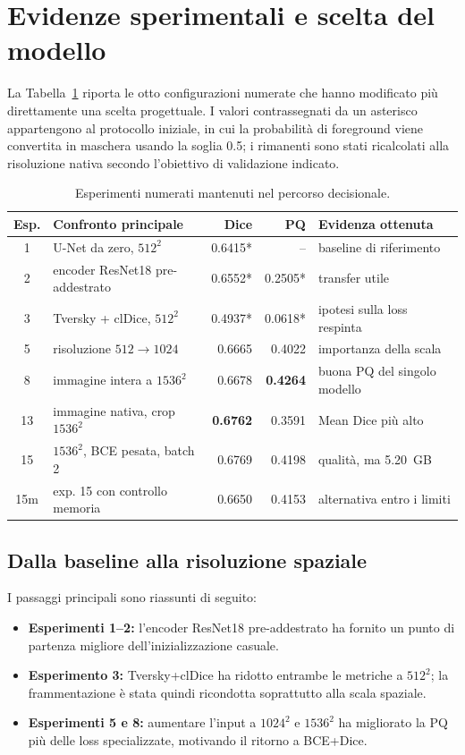 \section{Evidenze sperimentali e scelta del modello}
\label{sec:results}

La Tabella~\ref{tab:experiments} riporta le otto configurazioni numerate che hanno
modificato più direttamente una scelta progettuale. I valori contrassegnati da un
asterisco appartengono al protocollo iniziale, in cui la probabilità di foreground viene
convertita in maschera usando la soglia 0.5; i rimanenti sono stati
ricalcolati alla risoluzione nativa secondo l'obiettivo di validazione indicato.

\begin{table}[H]
  \centering
  \caption{Esperimenti numerati mantenuti nel percorso decisionale.}
  \label{tab:experiments}
  \small\begin{tabular}{clrrl}
    \toprule
    Esp. & Confronto principale & Dice & PQ & Evidenza ottenuta \\
    \midrule
    1 & U-Net da zero, $512^2$ & 0.6415* & -- & baseline di riferimento \\
    2 & encoder ResNet18 pre-addestrato & 0.6552* & 0.2505* & transfer utile \\
    3 & Tversky + clDice, $512^2$ & 0.4937* & 0.0618* & ipotesi sulla loss respinta \\
    5 & risoluzione $512\to1024$ & 0.6665 & 0.4022 & importanza della scala \\
    8 & immagine intera a $1536^2$ & 0.6678 & \textbf{0.4264} & buona PQ del singolo modello \\
    13 & immagine nativa, crop $1536^2$ & \textbf{0.6762} & 0.3591 & Mean Dice più alto \\
    15 & $1536^2$, BCE pesata, batch 2 & 0.6769 & 0.4198 & qualità, ma 5.20~GB \\
    15m & exp. 15 con controllo memoria & 0.6650 & 0.4153 & alternativa entro i limiti \\
    \bottomrule
  \end{tabular}
\end{table}

\subsection{Dalla baseline alla risoluzione spaziale}

I passaggi principali sono riassunti di seguito:

\begin{itemize}
\setlength{\itemsep}{0.15em}
\item \textbf{Esperimenti 1--2:} l'encoder ResNet18 pre-addestrato ha fornito un punto di partenza migliore dell'inizializzazione casuale.
\item \textbf{Esperimento 3:} Tversky+clDice ha ridotto entrambe le metriche a $512^2$; la frammentazione è stata quindi ricondotta soprattutto alla scala spaziale.
\item \textbf{Esperimenti 5 e 8:} aumentare l'input a $1024^2$ e $1536^2$ ha migliorato la PQ più delle loss specializzate, motivando il ritorno a BCE+Dice.
\end{itemize}

